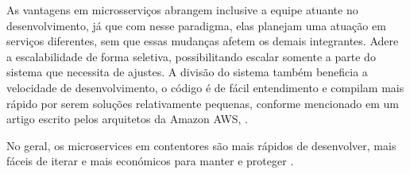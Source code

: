 As vantagens em microsserviços abrangem inclusive a equipe atuante no desenvolvimento, já que com nesse paradigma,
elas planejam uma atuação em serviços diferentes, sem que essas mudanças afetem os demais integrantes.
Adere a escalabilidade de forma seletiva, possibilitando escalar somente a parte do sistema que necessita de ajustes.
A divisão do sistema também beneficia a velocidade de desenvolvimento, o código é de fácil entendimento e
compilam mais rápido por serem soluções relativamente pequenas, conforme mencionado em um artigo escrito pelos
arquitetos da Amazon AWS, .

\begin{citacao}
No geral, os microservices em contentores são mais rápidos de desenvolver,
mais fáceis de iterar e mais económicos para manter e
proteger \cite{deploying-java-microservices-on-amazon-ec2-container-service}.
\end{citacao}
